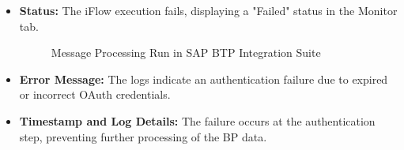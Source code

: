 \begin{itemize}
    \item \textbf{Status:} The iFlow execution fails, displaying a "Failed" status in the Monitor tab.
    
    \begin{figure}[H]
    \centering
    \caption{Message Processing Run in SAP BTP Integration Suite}
    
    \end{figure}
    
    \item \textbf{Error Message:} The logs indicate an authentication failure due to expired or incorrect OAuth credentials.
    \item \textbf{Timestamp and Log Details:} The failure occurs at the authentication step, preventing further processing of the BP data.
    
\end{itemize}

